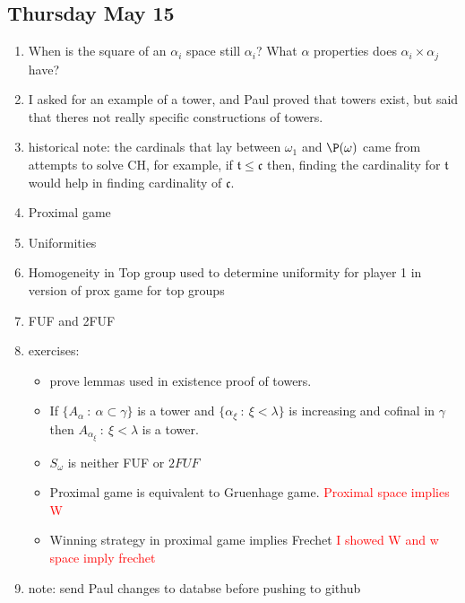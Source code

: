 \documentclass{article}
\begin{document}
\subsection*{Thursday May 15}
\begin{enumerate}
    \item When is the square of an \(\alpha_i\) space still \(\alpha_i\)? What \(\alpha\) properties does \(\alpha_i \times \alpha_j\) have?
    \item I asked for an example of a tower, and Paul proved that towers exist, but said that theres not really specific constructions of towers.
    \item historical note: the cardinals that lay between \(\omega_1\) and \(\P(\omega)\) came from attempts to solve CH, for example, if \(\mathfrak{t} \leq \mathfrak{c}\) then, finding the cardinality for \(\mathfrak{t}\) would help in finding cardinality of \(\mathfrak{c}\).
    \item Proximal game
    \item Uniformities
    \item Homogeneity in Top group used to determine uniformity for player 1 in version of prox game for top groups
    \item FUF and 2FUF
    \item exercises:
    \begin{itemize}
        \item prove lemmas used in existence proof of towers.
        \item If \(\{A_{\alpha} \: : \: \alpha \subset \gamma \}\) is a tower and \(\{\alpha_{\xi} \: : \: \xi < \lambda\}\) is increasing and cofinal in \(\gamma\) then \(A_{\alpha_\xi} \: : \: \xi < \lambda\) is a tower.
        \item \(S_{\omega}\) is neither FUF or \(2FUF\) \checkmark
        \item Proximal game is equivalent to Gruenhage game. \textcolor{red}{Proximal space implies W \checkmark}
        \item Winning strategy in proximal game implies Frechet \textcolor{red}{I showed W and w space imply frechet}
    \end{itemize}
    \item note: send Paul changes to databse before pushing to github
\end{enumerate}
\end{document}
